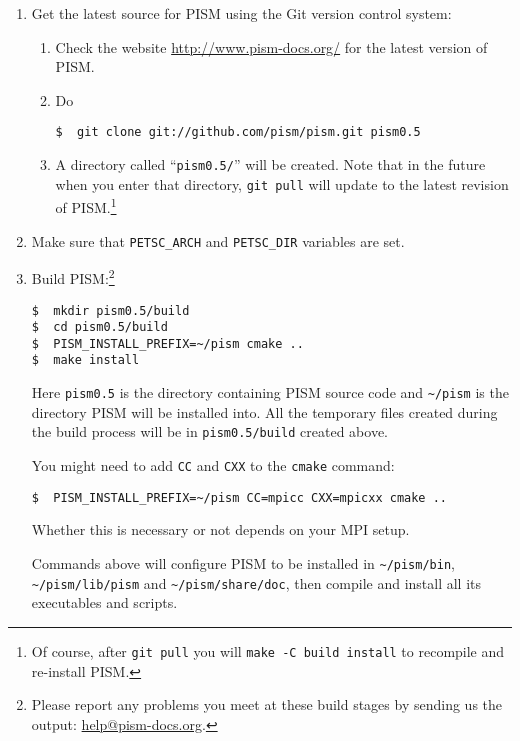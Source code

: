 \documentclass[titlepage,letterpaper,final]{scrartcl}
\begin{document}
\begin{enumerate}
\item Get the latest source for PISM using the Git version control system:
\begin{enumerate}
\item \label{getPISMstep} Check the website \url{http://www.pism-docs.org/} for the latest version of PISM.
\item Do
\begin{verbatim}
$  git clone git://github.com/pism/pism.git pism0.5
\end{verbatim}
\item A directory called ``\texttt{pism0.5/}'' will be created.  Note that in the future when you enter that directory,
  \texttt{git pull} will update to the latest revision of PISM.\footnote{Of course, after \texttt{git pull} you will \texttt{make -C
      build install} to recompile and re-install PISM.}
\end{enumerate}

\item Make sure that \texttt{PETSC_ARCH} and \texttt{PETSC_DIR} variables are set.

\item Build PISM:\footnote{Please report any problems you meet at these build stages by sending us the output: \href{mailto:help@pism-docs.org}{help@pism-docs.org}.}
\begin{verbatim}
$  mkdir pism0.5/build
$  cd pism0.5/build
$  PISM_INSTALL_PREFIX=~/pism cmake ..
$  make install
\end{verbatim}

Here \texttt{pism0.5} is the directory containing PISM source code and \texttt{\textasciitilde/pism} is the directory PISM will be installed into. All the temporary files created during the build process will be in \texttt{pism0.5/build} created above.

You might need to add \texttt{CC} and \texttt{CXX} to the \texttt{cmake}
command:
\begin{verbatim}
$  PISM_INSTALL_PREFIX=~/pism CC=mpicc CXX=mpicxx cmake ..
\end{verbatim}
Whether this is necessary or not depends on your MPI setup.

Commands above will configure PISM to be installed in \texttt{\textasciitilde/pism/bin},
\texttt{\textasciitilde/pism/lib/pism} and
\texttt{\textasciitilde/pism/share/doc}, then compile and install all its
executables and scripts.


\end{enumerate}
\end{document}
